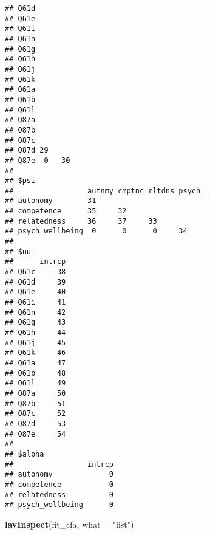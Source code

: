 \documentclass[
]{article}
\newenvironment{Shaded}{\begin{snugshade}}{\end{snugshade}}
\newcommand{\DataTypeTok}[1]{\textcolor[rgb]{0.13,0.29,0.53}{#1}}
\newcommand{\KeywordTok}[1]{\textcolor[rgb]{0.13,0.29,0.53}{\textbf{#1}}}
\newcommand{\NormalTok}[1]{#1}
\newcommand{\StringTok}[1]{\textcolor[rgb]{0.31,0.60,0.02}{#1}}
\begin{document}
\begin{verbatim}
## Q61d          
## Q61e          
## Q61i          
## Q61n          
## Q61g          
## Q61h          
## Q61j          
## Q61k          
## Q61a          
## Q61b          
## Q61l          
## Q87a          
## Q87b          
## Q87c          
## Q87d 29       
## Q87e  0   30  
## 
## $psi
##                 autnmy cmptnc rltdns psych_
## autonomy        31                         
## competence      35     32                  
## relatedness     36     37     33           
## psych_wellbeing  0      0      0     34    
## 
## $nu
##      intrcp
## Q61c     38
## Q61d     39
## Q61e     40
## Q61i     41
## Q61n     42
## Q61g     43
## Q61h     44
## Q61j     45
## Q61k     46
## Q61a     47
## Q61b     48
## Q61l     49
## Q87a     50
## Q87b     51
## Q87c     52
## Q87d     53
## Q87e     54
## 
## $alpha
##                 intrcp
## autonomy             0
## competence           0
## relatedness          0
## psych_wellbeing      0
\end{verbatim}

\begin{Shaded}
\begin{Highlighting}[]
\KeywordTok{lavInspect}\NormalTok{(fit_cfa, }\DataTypeTok{what =} \StringTok{"list"}\NormalTok{)}
\end{Highlighting}
\end{Shaded}
\end{document}
